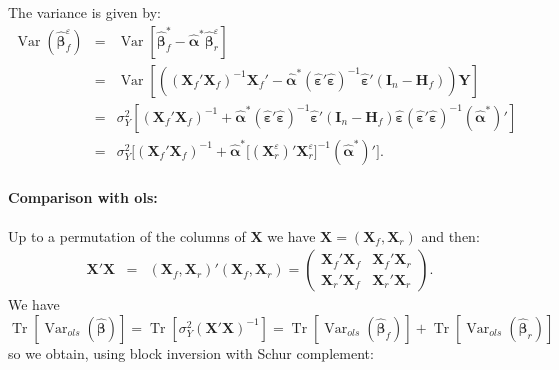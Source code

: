 \documentclass[12pt,a4paper]{report}
\begin{document}
The variance is given by:
	\begin{eqnarray}
		\operatorname{Var}(\hat{\boldsymbol{\beta}}_f^{\varepsilon})&=&\operatorname{Var}[\hat{\boldsymbol{\beta}}^*_f-\hat{\boldsymbol{\alpha}}^*\hat{\boldsymbol{\beta}}_{r}^{\varepsilon}] \nonumber \\
		&=&\operatorname{Var}\left[\left((\boldsymbol{X}_f'\boldsymbol{X}_f)^{-1}\boldsymbol{X}_f'-\hat{\boldsymbol{\alpha}}^*(\hat{\boldsymbol{\varepsilon}}'\hat{\boldsymbol{\varepsilon}})^{-1}\hat{\boldsymbol{\varepsilon}}'(\boldsymbol{I}_n-\boldsymbol{H}_f)\right)\boldsymbol{Y}\right]  \nonumber \\
		&=&\sigma_Y^2[(\boldsymbol{X}_f'\boldsymbol{X}_f)^{-1}+\hat{\boldsymbol{\alpha}}^*(\hat{\boldsymbol{\varepsilon}}'\hat{\boldsymbol{\varepsilon}})^{-1}\hat{\boldsymbol{\varepsilon}}'(\boldsymbol{I}_n-\boldsymbol{H}_f)\hat{\boldsymbol{\varepsilon}}(\hat{\boldsymbol{\varepsilon}}'\hat{\boldsymbol{\varepsilon}})^{-1}(\hat{\boldsymbol{\alpha}}^*)'] \nonumber \\
		&=&\sigma_Y^2\big[(\boldsymbol{X}_f'\boldsymbol{X}_f)^{-1}+\hat{\boldsymbol{\alpha}}^*\big[(\boldsymbol{X}_r^{\varepsilon})'\boldsymbol{X}_r^{\varepsilon}\big]^{-1}(\hat{\boldsymbol{\alpha}}^*)'\big]. \label{varpluginf}
	\end{eqnarray}

\paragraph{Comparison with {\sc ols}:}
Up to a permutation of the columns of $\boldsymbol{X}$ we have $\boldsymbol{X}=(\boldsymbol{X}_f,\boldsymbol{X}_r)$ and then:
\begin{eqnarray*}
	\boldsymbol{X}'\boldsymbol{X}&=&(\boldsymbol{X}_f,\boldsymbol{X}_r)'(\boldsymbol{X}_f,\boldsymbol{X}_r)=\left( 
	\begin{array}{cc}
	 \boldsymbol{X}_f'\boldsymbol{X}_f & \boldsymbol{X}_f'\boldsymbol{X}_r \\ 
	\boldsymbol{X}_r'\boldsymbol{X}_f & \boldsymbol{X}_r'\boldsymbol{X}_r
	\end{array} 
	\right).
\end{eqnarray*}
We have $\operatorname{Tr}[\operatorname{Var}_{ols}(\hat{\boldsymbol{\beta}})]=\operatorname{Tr}[\sigma_Y^2(\boldsymbol{X}'\boldsymbol{X})^{-1}]
=\operatorname{Tr}[\operatorname{Var}_{ols}(\hat{\boldsymbol{\beta}}_{f})]+\operatorname{Tr}[\operatorname{Var}_{ols}(\hat{\boldsymbol{\beta}}_{r})]$ so we obtain, using block inversion with Schur complement:
\end{document}
